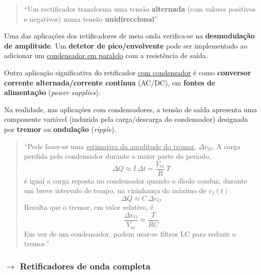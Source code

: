 \begin{quote}
    ``Um rectificador transforma uma tensão \textbf{alternada} (com valores positivos e negativos) numa tensão \textbf{unidireccional}''\cite{medeiros:ICEE}
\end{quote}

\noindent Uma das aplicações dos retificadores de meia onda verifica-se na \textbf{desmodulação de amplitude}\footnotemark[3]. Um \textbf{detetor de pico/envolvente} pode ser implementado ao adicionar um \underline{condensador em paralelo} com a resistência de saída.


Outra aplicação significativa do retificador \underline{com condensador} é como \textbf{conversor corrente alternada/corrente contínua} (AC/DC), em \textbf{fontes de alimentação} (\textit{power supplies}).

\vspace{0.9 em}
\noindent Na realidade, nas aplicações com condensadores, a tensão de saída apresenta uma componente variável (induzida pela carga/descarga do condensador) designada por \textbf{tremor} ou \textbf{ondulação} (\textit{ripple}).

\begin{quote}
    ``Pode fazer-se uma \underline{estimativa da amplitude do tremor}, $\Delta v_O$. A carga perdida pelo condensador durante a maior parte do período,
    $$
        \Delta Q \approx I\, \Delta t = \frac{V_m}{R}\, T
    $$
    é igual a carga reposta no condensador quando o díodo conduz, durante um breve intervalo de tempo, na vizinhança do máximo de $v_I(t)$
    $$
        \Delta Q \approx C\, \Delta v_O
    $$
    Resulta que o tremor, em valor relativo, é
    $$
        \frac{\Delta v_O}{V_m} \approx \frac{T}{RC}
    $$
    Em vez de um condensador, podem usar-se filtros LC para reduzir o tremor.''\cite{medeiros:ICEE}
\end{quote}

\subsubsection[2.2.1 Retificadores de onda completa]{$\pmb{\rightarrow}$ Retificadores de onda completa}

